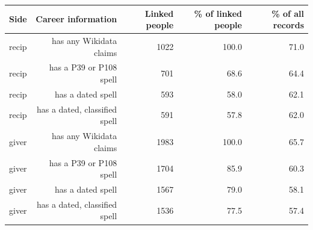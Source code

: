 \begin{tabular}{lrrrr}
\toprule
Side & Career information & Linked people & \% of linked people & \% of all records \\
\midrule
recip & has any Wikidata claims & 1022 & 100.0 & 71.0 \\
recip & has a P39 or P108 spell & 701 & 68.6 & 64.4 \\
recip & has a dated spell & 593 & 58.0 & 62.1 \\
recip & has a dated, classified spell & 591 & 57.8 & 62.0 \\
giver & has any Wikidata claims & 1983 & 100.0 & 65.7 \\
giver & has a P39 or P108 spell & 1704 & 85.9 & 60.3 \\
giver & has a dated spell & 1567 & 79.0 & 58.1 \\
giver & has a dated, classified spell & 1536 & 77.5 & 57.4 \\
\bottomrule
\end{tabular}
\par{}
